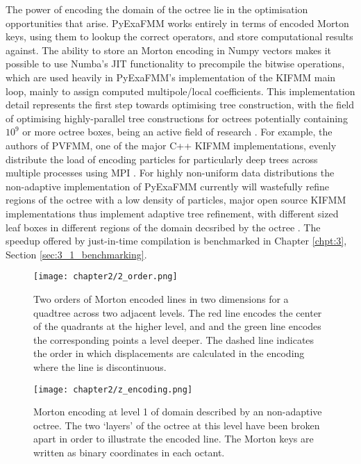 The power of encoding the domain of the octree lie in the optimisation opportunities
that arise. \gls{PyExaFMM} works entirely in terms of encoded Morton keys, using
them to lookup the correct operators, and store computational results against.
The ability to store an Morton encoding in Numpy vectors makes it possible to use
Numba's \gls{JIT} functionality to precompile the bitwise
operations, which are used heavily in \gls{PyExaFMM}'s implementation of the \gls{KIFMM}
main loop, mainly to assign computed multipole/local coefficients. This implementation
detail represents the first step towards optimising tree construction, with the
field of optimising highly-parallel tree constructions for octrees potentially containing
$10^9$ or more octree boxes, being an active field of research \cite{Sundar:2008:SIAM,Malhotra:2015:CCP}.
For example, the authors of PVFMM, one of the major C++ \gls{KIFMM} implementations,
evenly distribute the load of encoding particles for particularly deep trees across
multiple processes using \gls{MPI} \cite{Malhotra:2015:CCP}. For highly non-uniform
data distributions the non-adaptive implementation of \gls{PyExaFMM} currently
will wastefully refine regions of the octree with a low density of particles, major
open source \gls{KIFMM} implementations thus implement adaptive tree refinement,
with different sized leaf boxes in different regions of the domain decsribed by
the octree \cite{Ying:2004:JCP, Malhotra:2015:CCP, exafmm}. The speedup offered
by just-in-time compilation is benchmarked in Chapter \ref{chpt:3}, Section
\ref{sec:3_1_benchmarking}.

\begin{figure}[!h]
    \centering
    {\texttt{[image: chapter2/2\_order.png]}}
    \vspace{0pt}
    \caption{
        Two orders of Morton encoded lines in two dimensions for a quadtree across
        two adjacent levels. The red line encodes the center of the quadrants at the higher level,
        and and the green line encodes the corresponding points a level deeper.
        The dashed line indicates the order in which displacements are calculated
        in the encoding where the line is discontinuous.
    }
    \label{fig:2_2_multi_order}
\end{figure}


\begin{figure}[!h]
    \centering
    {\texttt{[image: chapter2/z\_encoding.png]}}
    \vspace{0pt}
    \caption{
        Morton encoding at level 1 of domain described by an non-adaptive octree.
        The two `layers' of the octree at this level have been broken apart
        in order to illustrate the encoded line. The Morton keys are written
        as binary coordinates in each octant.
    }
    \label{fig:2_2_morton_encoding}
\end{figure}